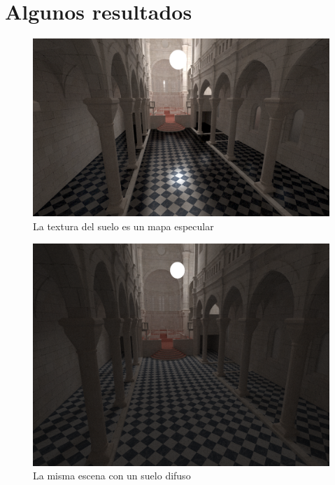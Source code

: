 \clearpage

\section{Algunos resultados}

\begin{figure}[h]
\centering
\includegraphics[width=5in]{sibenik_specular.png}
\caption{La textura del suelo es un mapa especular}
\end{figure}

\begin{figure}
\centering
\includegraphics[width=5in]{sibenik_difuse.png}
\caption{La misma escena con un suelo difuso}
\end{figure}


